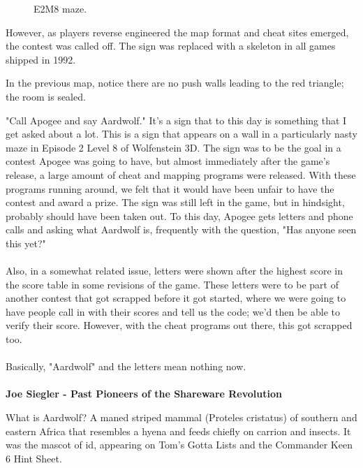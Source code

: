 \begin{figure}[H]
  \centering
 \caption{E2M8 maze.}
\end{figure}
\par
\begin{figure}
\end{figure}
However, as players reverse engineered the map format and cheat sites emerged, the contest was called off. The sign was replaced with a skeleton in all games shipped in 1992.\\
\par
In the previous map, notice there are no push walls leading to the red triangle; the room is sealed.\\
\begin{fancyquotes}
"Call Apogee and say Aardwolf."  It's a sign that to this day is something
that I get asked about a lot.  This is a sign that appears on a wall in a
particularly nasty maze in Episode 2 Level 8 of Wolfenstein 3D.  The sign
was to be the goal in a contest Apogee was going to have, but almost
immediately after the game's release, a large amount of cheat and mapping
programs were released.  With these programs running around, we felt that
it would have been unfair to have the contest and award a prize.  The sign
was still left in the game, but in hindsight, probably should have been
taken out.  To this day, Apogee gets letters and phone calls and asking
what Aardwolf is, frequently with the question, "Has anyone seen this yet?"\\
\\
Also, in a somewhat related issue, letters were shown after the highest score
in the score table in some revisions of the game.  These letters were to be
part of another contest that got scrapped before it got started, where we were
going to have people call in with their scores and tell us the code; we'd then
be able to verify their score.  However, with the cheat programs out there,
this got scrapped too.\\
\\
Basically, "Aardwolf" and the letters mean nothing now.\\
\\
\textbf{Joe Siegler - Past Pioneers of the Shareware Revolution}
\end{fancyquotes}
\par
\bigskip
{} What is Aardwolf? A maned striped mammal (Proteles cristatus) of southern and eastern Africa that resembles a hyena and feeds chiefly on carrion and insects. It was the mascot of id, appearing on Tom's Gotta Lists and the Commander Keen 6 Hint Sheet.\\
\par

